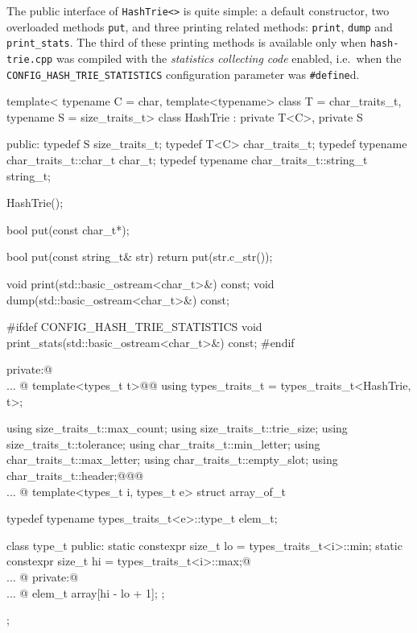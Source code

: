 \documentclass[a4paper,11pt]{article}
\makeatletter
\renewcommand{\=}{\protect\nobreakdash-\hspace{0pt}}
\renewcommand{\~}{\protect\nobreakdash--\hspace{0pt}}
\newcommand{\ie}{i.e.}
\newcommand{\code}[1]{{\tt{#1}}}
\newcommand\code*[1]{\mbox{\code{#1}}}
\let\lst@ifskiplines\iffalse
\newcommand\skipnumbering[1]{%
	\setcounter{lstnumber}{\numexpr#1-1\relax}%
	\let\lst@ifskiplines\iftrue
	\\\lst@PlaceNumber
	\let\lst@ifskiplines\iffalse
	\lst@ifshowskiplines...\fi
}
\let\lst@PlaceNumber\@empty
\newcommand{\define}{\code{{\#}define}}%
\makeatother
\begin{document}
The public interface of \code{HashTrie<>} is quite simple: a default constructor,
two overloaded methods \code{put}, and three printing related methods:
\code{print},
\code{dump} and
\code{print\_stats}.
The third of these printing methods is available only when \code{hash-trie.cpp}
was compiled with the \emph{statistics collecting code} enabled, \ie\ when the
\code{CONFIG\_HASH\_TRIE\_STATISTICS} configuration parameter was
\define d.
%
%
\begin{hashtrielisting}[2006]
template<
	typename C = char,
	template<typename> class T = char_traits_t,
	typename S = size_traits_t>
class HashTrie :
	private T<C>,
	private S
{
public:
	typedef S size_traits_t;
	typedef T<C> char_traits_t;
	typedef typename char_traits_t::char_t char_t;
	typedef typename char_traits_t::string_t string_t;

	HashTrie();

	bool put(const char_t*);

	bool put(const string_t& str)
	{ return put(str.c_str()); }

	void print(std::basic_ostream<char_t>&) const;
	void dump(std::basic_ostream<char_t>&) const;

#ifdef CONFIG_HASH_TRIE_STATISTICS
	void print_stats(std::basic_ostream<char_t>&) const;
#endif

private:@\skipnumbering{2038}@
	template<types_t t>@\label{cpp-inner-types-traits-begin}@
	using types_traits_t = types_traits_t<HashTrie, t>;

	using size_traits_t::max_count;
	using size_traits_t::trie_size;
	using size_traits_t::tolerance;
	using char_traits_t::min_letter;
	using char_traits_t::max_letter;
	using char_traits_t::empty_slot;
	using char_traits_t::header;@\label{cpp-inner-types-traits-end}@@\skipnumbering{2106}@
	template<types_t i, types_t e>
	struct array_of_t
	{
		typedef
			typename types_traits_t<e>::type_t
			elem_t;

		class type_t
		{
		public:
			static constexpr size_t lo =
				types_traits_t<i>::min;
			static constexpr size_t hi =
				types_traits_t<i>::max;@\skipnumbering{2200}@
		private:@\skipnumbering{2206}@
			elem_t array[hi - lo + 1];
		};
	};

}
\end{hashtrielisting}
\end{document}
